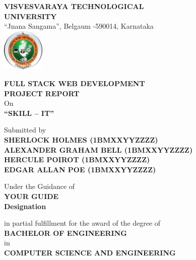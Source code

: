 \documentclass[a4paper,12pt]{article}
\begin{document}
\begin{titlepage}
    \centering
    
    \textbf{
    {\large VISVESVARAYA TECHNOLOGICAL}\\[0.5em]
    {\large UNIVERSITY}}\\[0.5em]
    {\large “Jnana Sangama”, Belgaum -590014, Karnataka} \\
    
    \vspace*{0.5cm}
    \includegraphics[width=0.15\textwidth]{vtu.png} \\

    \vspace{0.5cm}
    
    {\large \textbf{FULL STACK WEB DEVELOPMENT}}\\[0.5em]
    {\large \textbf{PROJECT REPORT}} \\
    \vspace{0.25cm}
    {\large On} \\
    \vspace{0.5cm}
    {\Large \textbf{“SKILL – IT”}} \\
    
    \vspace{0.5cm}
    
    {\large Submitted by} \\
    \vspace{0.5cm}
    \textbf{
    {\large SHERLOCK HOLMES (1BMXXYYZZZZ)} \\
    {\large ALEXANDER GRAHAM BELL (1BMXXYYZZZZ)} \\
    {\large HERCULE POIROT (1BMXXYYZZZZ)} \\
    {\large EDGAR ALLAN POE (1BMXXYYZZZZ)} \\
    }
    \vspace{0.75cm}
    
    {\large Under the Guidance of} \\
    \textbf{
    {\large YOUR GUIDE}\\
    {\large Designation} \\
    }
    \vspace{0.5cm}
    
    {\large in partial fulfillment for the award of the degree of} \\
    \vspace{0.5cm}
    {\large \textbf{BACHELOR OF ENGINEERING}} \\
    \vspace{0.125cm}
    {\large in} \\
    \vspace{0.25cm}
    {\large \textbf{COMPUTER SCIENCE AND ENGINEERING}} \\
    

\end{titlepage}
\end{document}
